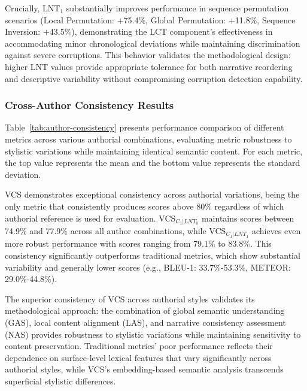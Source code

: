 \documentclass[main.tex]{subfiles}
\begin{document}
Crucially, LNT$_1$ substantially improves performance in sequence permutation scenarios (Local Permutation: +75.4\%, Global Permutation: +11.8\%, Sequence Inversion: +43.5\%), demonstrating the LCT component's effectiveness in accommodating minor chronological deviations while maintaining discrimination against severe corruptions. This behavior validates the methodological design: higher LNT values provide appropriate tolerance for both narrative reordering and descriptive variability without compromising corruption detection capability.

\subsubsection{Cross-Author Consistency Results}

Table~\ref{tab:author-consistency} presents performance comparison of different metrics across various authorial combinations, evaluating metric robustness to stylistic variations while maintaining identical semantic content. For each metric, the top value represents the mean and the bottom value represents the standard deviation.

VCS demonstrates exceptional consistency across authorial variations, being the only metric that consistently produces scores above 80\% regardless of which authorial reference is used for evaluation. VCS$_{C_1|LNT_0}$ maintains scores between 74.9\% and 77.9\% across all author combinations, while VCS$_{C_1|LNT_1}$ achieves even more robust performance with scores ranging from 79.1\% to 83.8\%. This consistency significantly outperforms traditional metrics, which show substantial variability and generally lower scores (e.g., BLEU-1: 33.7\%-53.3\%, METEOR: 29.0\%-44.8\%).

The superior consistency of VCS across authorial styles validates its methodological approach: the combination of global semantic understanding (GAS), local content alignment (LAS), and narrative consistency assessment (NAS) provides robustness to stylistic variations while maintaining sensitivity to content preservation. Traditional metrics' poor performance reflects their dependence on surface-level lexical features that vary significantly across authorial styles, while VCS's embedding-based semantic analysis transcends superficial stylistic differences.
\end{document}
